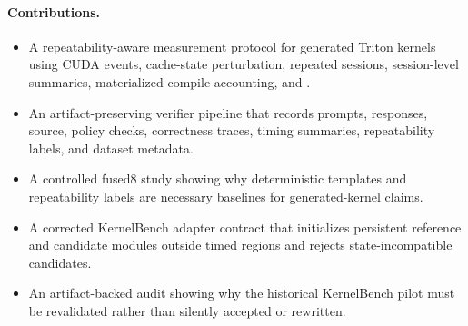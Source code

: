 \paragraph{Contributions.}
\begin{itemize}
  \item A repeatability-aware measurement protocol for generated Triton kernels using CUDA events, cache-state perturbation, repeated sessions, session-level summaries, materialized compile accounting, and \compile{}.
  \item An artifact-preserving verifier pipeline that records prompts, responses, source, policy checks, correctness traces, timing summaries, repeatability labels, and dataset metadata.
  \item A controlled fused8 study showing why deterministic templates and repeatability labels are necessary baselines for generated-kernel claims.
  \item A corrected KernelBench adapter contract that initializes persistent reference  and candidate  modules outside timed regions and rejects state-incompatible candidates.
  \item An artifact-backed audit showing why the historical KernelBench pilot must be revalidated rather than silently accepted or rewritten.
\end{itemize}
